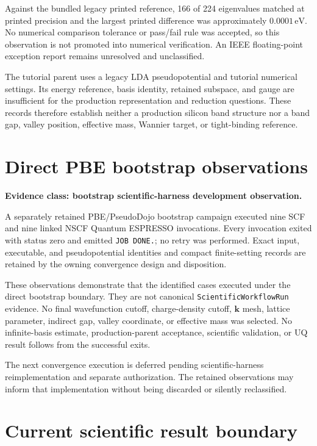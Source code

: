 Against the bundled legacy printed reference, 166 of 224 eigenvalues matched at
printed precision and the largest printed difference was approximately
$0.0001\,\mathrm{eV}$. No numerical comparison tolerance or pass/fail rule was
accepted, so this observation is not promoted into numerical verification. An
IEEE floating-point exception report remains unresolved and unclassified.

The tutorial parent uses a legacy LDA pseudopotential and tutorial numerical
settings. Its energy reference, basis identity, retained subspace, and gauge are
insufficient for the production representation and reduction questions. These
records therefore establish neither a production silicon band structure nor a
band gap, valley position, effective mass, Wannier target, or tight-binding
reference.

\section{Direct PBE bootstrap observations}

\textbf{Evidence class: bootstrap scientific-harness development observation.}

A separately retained PBE/PseudoDojo bootstrap campaign executed nine SCF and
nine linked NSCF Quantum ESPRESSO invocations. Every invocation exited with
status zero and emitted \texttt{JOB DONE.}; no retry was performed. Exact input,
executable, and pseudopotential identities and compact finite-setting records
are retained by the owning convergence design and disposition.

These observations demonstrate that the identified cases executed under the
direct bootstrap boundary. They are not canonical
\texttt{ScientificWorkflowRun} evidence. No final wavefunction cutoff,
charge-density cutoff, $\mathbf k$ mesh, lattice parameter, indirect gap,
valley coordinate, or effective mass was selected. No infinite-basis estimate,
production-parent acceptance, scientific validation, or UQ result follows from
the successful exits.

The next convergence execution is deferred pending scientific-harness
reimplementation and separate authorization. The retained observations may
inform that implementation without being discarded or silently reclassified.

\section{Current scientific result boundary}

